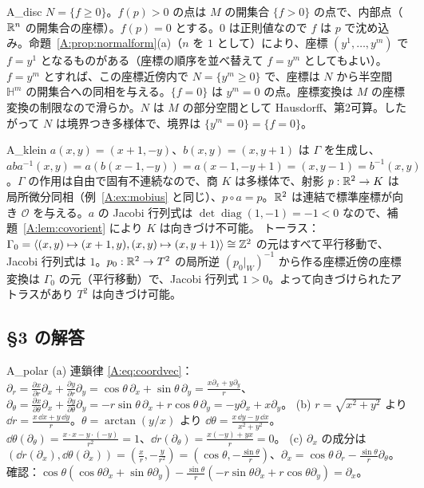 \begin{soll}{A_disc}
$N=\{f\ge0\}$。$f(p)>0$ の点は $M$ の開集合 $\{f>0\}$ の点で、内部点（$\mathbb R^n$ の開集合の座標）。$f(p)=0$ とする。$0$ は正則値なので $f$ は $p$ で沈め込み。命題~\ref{A:prop:normalform}(a)（$n$ を $1$ として）により、座標 $(y^1,\dots,y^m)$ で $f=y^1$ となるものがある（座標の順序を並べ替えて $f=y^m$ としてもよい）。$f=y^m$ とすれば、この座標近傍内で $N=\{y^m\ge0\}$ で、座標は $N$ から半空間 $\mathbb H^m$ の開集合への同相を与える。$\{f=0\}$ は $y^m=0$ の点。座標変換は $M$ の座標変換の制限なので滑らか。$N$ は $M$ の部分空間として Hausdorff、第2可算。したがって $N$ は境界つき多様体で、境界は $\{y^m=0\}=\{f=0\}$。
\end{soll}

\begin{soll}{A_klein}
$a(x,y)=(x+1,-y)$、$b(x,y)=(x,y+1)$ は $\Gamma$ を生成し、$aba^{-1}(x,y)=a(b(x-1,-y))=a(x-1,-y+1)=(x,y-1)=b^{-1}(x,y)$。$\Gamma$ の作用は自由で固有不連続なので、商 $K$ は多様体で、射影 $p:\mathbb R^2\to K$ は局所微分同相（例~\ref{A:ex:mobius} と同じ）、$p\circ a=p$。$\mathbb R^2$ は連結で標準座標が向き $\mathcal O$ を与える。$a$ の Jacobi 行列式は $\det\operatorname{diag}(1,-1)=-1<0$ なので、補題~\ref{A:lem:covorient} により $K$ は向きづけ不可能。
トーラス：$\Gamma_0=\langle(x,y)\mapsto(x+1,y),(x,y)\mapsto(x,y+1)\rangle\cong\mathbb Z^2$ の元はすべて平行移動で、Jacobi 行列式は $1$。$p_0:\mathbb R^2\to T^2$ の局所逆 $(p_0|_W)^{-1}$ から作る座標近傍の座標変換は $\Gamma_0$ の元（平行移動）で、Jacobi 行列式 $1>0$。よって向きづけられたアトラスがあり $T^2$ は向きづけ可能。
\end{soll}

\subsection*{§3 の解答}

\begin{soll}{A_polar}
(a) 連鎖律 \eqref{A:eq:coordvec}：$\partial_r=\frac{\partial x}{\partial r}\partial_x+\frac{\partial y}{\partial r}\partial_y=\cos\theta\,\partial_x+\sin\theta\,\partial_y=\frac{x\partial_x+y\partial_y}{r}$、$\partial_\theta=\frac{\partial x}{\partial\theta}\partial_x+\frac{\partial y}{\partial\theta}\partial_y=-r\sin\theta\,\partial_x+r\cos\theta\,\partial_y=-y\partial_x+x\partial_y$。
(b) $r=\sqrt{x^2+y^2}$ より $\dd r=\frac{x\,\dd x+y\,\dd y}{r}$。$\theta=\arctan(y/x)$ より $\dd\theta=\frac{x\,\dd y-y\,\dd x}{x^2+y^2}$。$\dd\theta(\partial_\theta)=\frac{x\cdot x-y\cdot(-y)}{r^2}=1$、$\dd r(\partial_\theta)=\frac{x(-y)+yx}{r}=0$。
(c) $\partial_x$ の成分は $(\dd r(\partial_x),\dd\theta(\partial_x))=(\frac xr,-\frac y{r^2})=(\cos\theta,-\frac{\sin\theta}r)$、$\partial_x=\cos\theta\,\partial_r-\frac{\sin\theta}r\partial_\theta$。確認：$\cos\theta(\cos\theta\partial_x+\sin\theta\partial_y)-\frac{\sin\theta}r(-r\sin\theta\partial_x+r\cos\theta\partial_y)=\partial_x$。
\end{soll}

